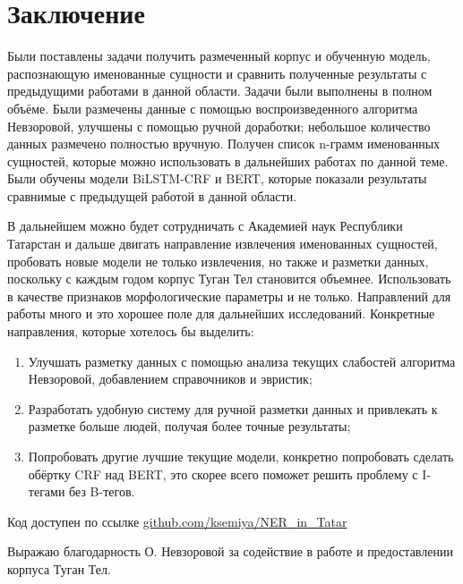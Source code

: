 \section{Заключение}

Были поставлены задачи получить размеченный корпус и обученную модель, распознающую именованные сущности и сравнить полученные результаты с предыдущими работами в данной области. Задачи были выполнены в полном объёме. Были размечены данные с помощью воспроизведенного алгоритма Невзоровой, улучшены с помощью ручной доработки; небольшое количество данных размечено полностью вручную. Получен список n-грамм именованных сущностей, которые можно использовать в дальнейших работах по данной теме. Были обучены модели BiLSTM-CRF и BERT, которые показали результаты сравнимые с предыдущей работой в данной области. 

В дальнейшем можно будет сотрудничать с Академией наук Республики Татарстан и дальше двигать направление извлечения именованных сущностей, пробовать новые модели не только извлечения, но также и разметки данных, поскольку с каждым годом корпус Туган Тел становится объемнее. Использовать в качестве признаков морфологические параметры и не только. Направлений для работы много и это хорошее поле для дальнейших исследований. Конкретные направления, которые хотелось бы выделить:

\begin{enumerate}
\item Улучшать разметку данных с помощью анализа текущих слабостей алгоритма Невзоровой, добавлением справочников и эвристик; 
\item Разработать удобную систему для ручной разметки данных и привлекать к разметке больше людей, получая более точные результаты;
\item Попробовать другие лучшие текущие модели, конкретно попробовать сделать обёртку CRF над BERT, это скорее всего поможет решить проблему с I-тегами без B-тегов.
\end{enumerate}

Код доступен по ссылке \href{https://github.com/ksemiya/NER\_in\_Tatar}{github.com/ksemiya/NER\_in\_Tatar}

Выражаю благодарность О. Невзоровой за содействие в работе и предоставлении корпуса Туган Тел.